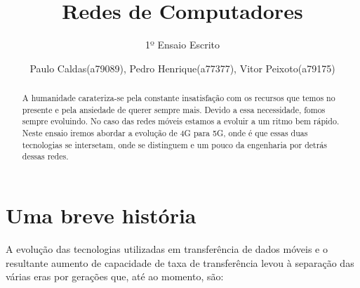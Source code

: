 \documentclass{llncs}
\begin{document}
\title{Redes de Computadores}
\subtitle{1º Ensaio Escrito}
%
\author{Paulo Caldas(a79089), Pedro Henrique(a77377), Vitor Peixoto(a79175)}
%



\maketitle              %

\begin{abstract}
    A humanidade carateriza-se pela constante insatisfação com os recursos que temos no presente e pela ansiedade de querer sempre mais. Devido a essa necessidade, fomos sempre evoluindo. No caso das redes móveis estamos a evoluir a um ritmo bem rápido. Neste ensaio iremos abordar a evolução de 4G para 5G, onde é que essas duas tecnologias se intersetam, onde se distinguem e um pouco da engenharia por detrás dessas redes.
\end{abstract}
%

\section{Uma breve história}
\hspace*{1.5em}A evolução das tecnologias utilizadas em transferência de dados móveis e o resultante aumento de capacidade de taxa de transferência levou à separação das várias eras por gerações que, até ao momento, são:
\end{document}

